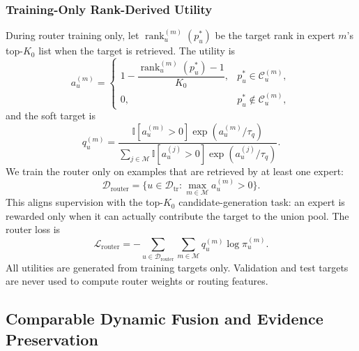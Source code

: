 \documentclass[journal]{IEEEtran}
\newcommand{\Experts}{\mathcal{M}}
\newcommand{\Train}{\mathcal{D}_{\mathrm{tr}}}
\newcommand{\Ind}{\mathbb{I}}
\begin{document}
\subsubsection{Training-Only Rank-Derived Utility}

During router training only, let $\operatorname{rank}_{u}^{(m)}(p_u^{*})$ be
the target rank in expert $m$'s top-$K_0$ list when the target is retrieved.
The utility is
\begin{equation}
a_{u}^{(m)}
=
\begin{cases}
1-\dfrac{\operatorname{rank}_{u}^{(m)}(p_u^{*})-1}{K_0},
&p_u^{*}\in\mathcal{C}_{u}^{(m)},\\[7pt]
0,&p_u^{*}\notin\mathcal{C}_{u}^{(m)},
\end{cases}
\label{eq:expert_utility}
\end{equation}
and the soft target is
\begin{equation}
q_{u}^{(m)}
=
\frac{
\Ind[a_u^{(m)}>0]\exp(a_{u}^{(m)}/\tau_q)
}{
\sum_{j\in\Experts}
\Ind[a_u^{(j)}>0]\exp(a_{u}^{(j)}/\tau_q)
}.
\label{eq:utility_target}
\end{equation}
We train the router only on examples that are retrieved by at least one expert:
\begin{equation}
\mathcal{D}_{\mathrm{router}}
=
\{u\in\Train:\max_{m\in\Experts}a_u^{(m)}>0\}.
\label{eq:router_training_set}
\end{equation}
This aligns supervision with the top-$K_0$ candidate-generation task: an expert
is rewarded only when it can actually contribute the target to the union pool.
The router loss is
\begin{equation}
\mathcal{L}_{\mathrm{router}}
=
-
\sum_{u\in\mathcal{D}_{\mathrm{router}}}
\sum_{m\in\Experts}
q_{u}^{(m)}\log\pi_{u}^{(m)}.
\label{eq:router_loss}
\end{equation}
All utilities are generated from training targets only.
Validation and test targets are never used to compute router weights or
routing features.

\subsection{Comparable Dynamic Fusion and Evidence Preservation}
\label{subsec:fusion}
\end{document}
